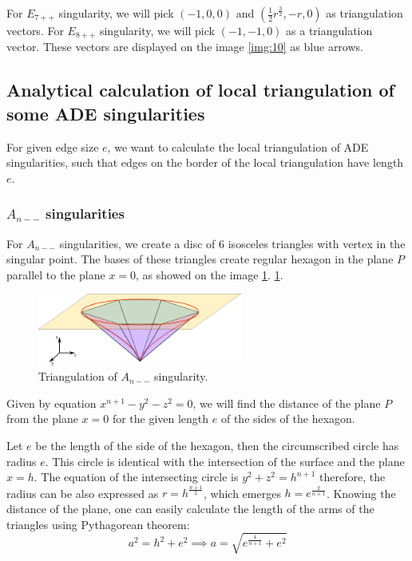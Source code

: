 \begin{definition}
For $E_{7++}$ singularity, we will pick $(-1, 0, 0)$ and 
$(\frac{1}{2}r^{\frac{3}{2}}, -r, 0)$ as triangulation vectors.
For $E_{8++}$ singularity, we will pick $(-1, -1, 0)$ as a triangulation vector.
These vectors are displayed on the image \ref{img:10} as blue arrows.

\subsection*{Analytical calculation of local triangulation of some ADE singularities}
For given edge size $e$, we want to calculate the local triangulation of ADE
singularities, such that edges on the border of the local triangulation
have length $e$.
\subsubsection*{$A_{n--}$ singularities}
For $A_{n--}$ singularities, we create a disc of $6$ isosceles triangles
with vertex in the singular point. The bases of these triangles create regular
hexagon in the plane $P$ parallel to the plane $x=0$, as showed on the image
\ref{img:11}.
\ref{img:11}.
\begin{figure}
    \centerline{\includegraphics[width=0.6\textwidth]{images/img11}}
    \caption[Triangulation of $A_{n--}$ singularity.]
    {Triangulation of $A_{n--}$ singularity.}
    \label{img:11}
\end{figure}
Given by equation $x^{n+1}-y^2-z^2=0$, we will find the distance of the 
plane $P$ from the plane $x=0$ for the given length $e$ of the sides of
the hexagon.

Let $e$ be the length of the side of the hexagon, then the circumscribed
circle has radius $e$. This circle is identical with the intersection of
the surface and the plane $x=h$. The equation of the intersecting circle
is $y^2+z^2=h^{n+1}$ therefore, the radius can be also expressed as 
$r=h^{\frac{n+1}{2}}$, which emerges $h=e^{\frac{2}{n+1}}$. Knowing the
distance of the plane, one can easily calculate the length of the arms of
the triangles using Pythagorean theorem: 
$$a^2=h^2+e^2 \implies a = \sqrt{e^{\frac{4}{n+1}} + e^2}$$


\end{definition}
